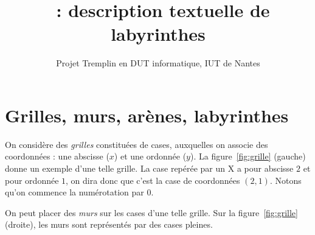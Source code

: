 \documentclass[a4paper]{paper}
\title{\nomFormat{}~: description textuelle de labyrinthes}
\author{\textrm{Projet} \textsf{Tremplin en DUT informatique},
\textrm{IUT de Nantes}}
\begin{document}
\maketitle

\section{Grilles, murs, arènes, labyrinthes}

On considère des \emph{grilles} constituées de cases, auxquelles on associe des coordonnées : une abscisse ($x$) et une ordonnée ($y$).
La figure~\ref{fig:grille} (gauche) donne un exemple d'une telle grille.
La case repérée par un X a pour abscisse $2$ et pour ordonnée $1$, on dira donc que c'est la case de coordonnées $(2, 1)$. Notons qu'on commence la numérotation par 0.

On peut placer des \emph{murs} sur les cases d'une telle grille.
Sur la figure~\ref{fig:grille} (droite), les murs sont représentés par des cases pleines.
\end{document}
